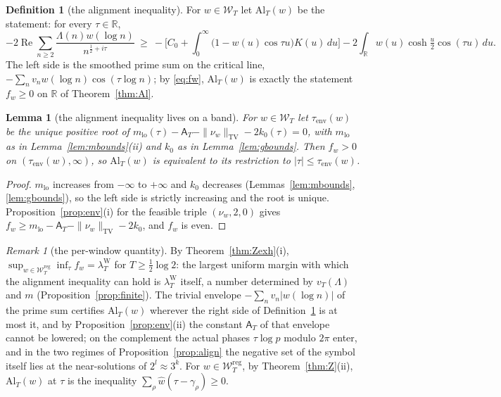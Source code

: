 \documentclass[11pt]{amsart}
\newtheorem{lemma}[theorem]{Lemma}
\theoremstyle{definition}
\newtheorem{definition}[theorem]{Definition}
\theoremstyle{remark}
\newtheorem{remark}[theorem]{Remark}
\newcommand{\R}{\mathbb R}
\newcommand{\Rel}{\operatorname{Re}}
\newcommand{\TV}{\operatorname{TV}}
\newcommand{\lamW}{\lambda^{\mathrm W}_T}
\newcommand{\wh}{\widehat w}
\newcommand{\Wcl}{\mathcal W_T}
\newcommand{\Aconst}{\mathsf A_T}
\begin{document}
\begin{definition}[the alignment inequality]\label{def:Al}
For $w\in\Wcl$ let $\mathrm{Al}_T(w)$ be the statement: for every $\tau\in\R$,
\[
-2\Rel\sum_{n\ge2}\frac{\Lambda(n)w(\log n)}{n^{\frac12+i\tau}}\ \ge\
-\Big[C_0+\int_0^\infty\big(1-w(u)\cos\tau u\big)K(u)\,du\Big]-2\int_\R w(u)\cosh\tfrac u2\cos(\tau u)\,du .
\]
The left side is the smoothed prime sum on the critical line, $-\sum_nv_nw(\log n)\cos(\tau\log n)$; by
\eqref{eq:fw}, $\mathrm{Al}_T(w)$ is exactly the statement $f_w\ge0$ on $\R$ of Theorem~\ref{thm:Al}.
\end{definition}

\begin{lemma}[the alignment inequality lives on a band]\label{lem:Alband}
For $w\in\Wcl$ let $\tau_{\mathrm{env}}(w)$ be the unique positive root of
$m_{\mathrm{lo}}(\tau)-\Aconst-\|\nu_w\|_{\TV}-2k_0(\tau)=0$, with $m_{\mathrm{lo}}$ as in Lemma~\ref{lem:mbounds}(ii)
and $k_0$ as in Lemma~\ref{lem:gbounds}. Then $f_w>0$ on $(\tau_{\mathrm{env}}(w),\infty)$, so $\mathrm{Al}_T(w)$ is
equivalent to its restriction to $|\tau|\le\tau_{\mathrm{env}}(w)$.
\end{lemma}
\begin{proof}
$m_{\mathrm{lo}}$ increases from $-\infty$ to $+\infty$ and $k_0$ decreases (Lemmas~\ref{lem:mbounds}, \ref{lem:gbounds}),
so the left side is strictly increasing and the root is unique. Proposition~\ref{prop:env}(i) for the feasible
triple $(\nu_w,2,0)$ gives $f_w\ge m_{\mathrm{lo}}-\Aconst-\|\nu_w\|_{\TV}-2k_0$, and $f_w$ is even.
\end{proof}

\begin{remark}[the per-window quantity]\label{rem:excess}
By Theorem~\ref{thm:Zexh}(i), $\sup_{w\in\Wcl^{\mathrm{reg}}}\inf_\tau f_w=\lamW$ for $T\ge\frac12\log2$: the largest
uniform margin with which the alignment inequality can hold is $\lamW$ itself, a number determined by
$v_T(\Lambda)$ and $m$ (Proposition~\ref{prop:finite}). The trivial envelope $-\sum_nv_n|w(\log n)|$ of the prime
sum certifies $\mathrm{Al}_T(w)$ wherever the right side of Definition~\ref{def:Al} is at most it, and by
Proposition~\ref{prop:env}(ii) the constant $\Aconst$ of that envelope cannot be lowered; on the complement the
actual phases $\tau\log p$ modulo $2\pi$ enter, and in the two regimes of Proposition~\ref{prop:align} the
negative set of the symbol itself lies at the near-solutions of $2^l\approx3^k$. For $w\in\Wcl^{\mathrm{reg}}$, by
Theorem~\ref{thm:Z}(ii), $\mathrm{Al}_T(w)$ at $\tau$ is the inequality $\sum_\rho\wh(\tau-\gamma_\rho)\ge0$.
\end{remark}
\end{document}
